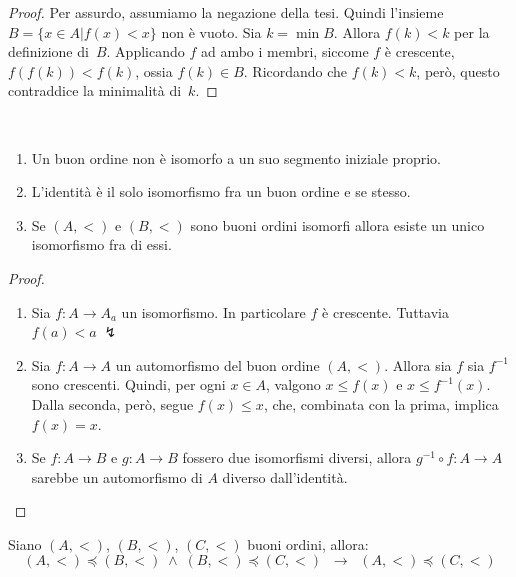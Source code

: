 \begin{proof}
	Per assurdo, assumiamo la negazione della tesi. Quindi l'insieme $B = \{x \in A | f(x) < x\}$ non \`e vuoto. Sia $k = \min B$.
	Allora $f(k) < k$ per la definizione di~$B$. Applicando $f$ ad
ambo i membri, siccome $f$ \`e
crescente, $f(f(k))<f(k)$, ossia $f(k) \in B$. Ricordando che $f(k)<k$, per\`o,
questo contraddice la minimalit\`a di~$k$.
\end{proof}

\begin{corollary}\label{cor-bonanza}
\ 
\baselineskip
\ 
	\begin{enumerate}[(1)]
		\item Un buon ordine non \`e isomorfo a un suo segmento iniziale proprio.
		\item L'identit\`a \`e il solo isomorfismo fra un buon ordine e se stesso.
		\item Se $(A,<)$ e $(B,<)$ sono buoni ordini isomorfi allora esiste un unico isomorfismo fra di essi.
	\end{enumerate}
\end{corollary}

\begin{proof}\ 

\baselineskip
	\begin{enumerate}[(1)]
		\item Sia $f \colon A \to A_a$ un isomorfismo.
		In particolare $f$ \`e crescente. Tuttavia $f(a) <
a\;\lightning$
		\item Sia $f \colon A \to A$ un automorfismo del buon
ordine $(A,<)$. Allora sia $f$ sia $f^{-1}$ sono crescenti. Quindi, per
ogni $x\in A$, valgono
$x\le f(x)$ e $x\le f^{-1}(x)$. Dalla seconda, per\`o, segue $f(x)\le x$,
che, combinata con la prima, implica $f(x)=x$.
		\item Se $f \colon A \to B$ e $g \colon A \to B$ fossero
due isomorfismi diversi, allora $g^{-1} \circ f \colon A \to A$ sarebbe un
automorfismo di $A$ diverso dall'identit\`a.
	\end{enumerate}
\end{proof}

\begin{remark}
	Siano $(A,<)$, $(B,<)$, $(C,<)$ buoni ordini, allora:
	\[ (A,<) \preceq (B,<) \;\land\; (B,<) \preceq (C,<)
\;\;\rightarrow\;\; (A,<) \preceq (C,<)
		\]
\end{remark}

